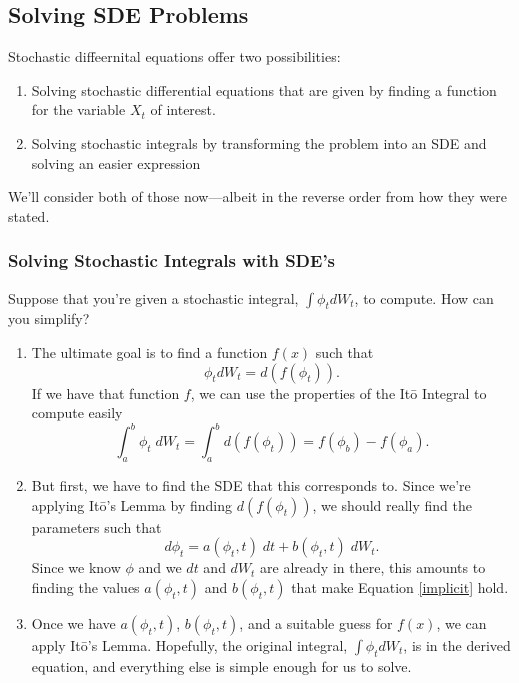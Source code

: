 \documentclass[a4paper,12pt]{scrartcl}
\begin{document}
\subsection{Solving SDE Problems}

Stochastic diffeernital equations offer two possibilities:
   \begin{enumerate}
      \item{Solving stochastic differential equations that are given 
	 by finding a function for the variable $X_t$ of interest.}
      \item{Solving stochastic integrals by transforming the problem
	 into an SDE and solving an easier expression}
   \end{enumerate}
We'll consider both of those now---albeit in the reverse order from
how they were stated.

\subsubsection{Solving Stochastic Integrals with SDE's}

Suppose that you're given a stochastic integral, $\int \phi_t dW_t$,
to compute. How can you simplify?
\begin{enumerate}
   \item{The ultimate goal is to find a function $f(x)$ such that 
      \[\phi_t dW_t = d(f(\phi_t)).\]
      If we have that function $f$, we can use the properties of the
      It\={o} Integral to compute easily
      \[ \int^b_a \phi_t\; dW_t =  \int^b_a d(f(\phi_t)) = 
	 f(\phi_b) - f(\phi_a).\]
	 }
   \item{But first, we have to find the SDE that this corresponds to. 
      Since we're applying It\={o}'s Lemma by finding $d(f(\phi_t))$, we
      should really find the parameters such that
      \begin{equation}
	 \label{implicit}
	 d\phi_t = a(\phi_t, t)\;dt + b(\phi_t, t) \; dW_t.
      \end{equation}
      Since we know $\phi$ and we $dt$ and $dW_t$ are already in there,
      this amounts to finding the values $a(\phi_t, t)$ and $b(\phi_t,t)$
      that make Equation \ref{implicit} hold.
	 } 
   \item{Once we have $a(\phi_t, t)$, $b(\phi_t, t)$, and a suitable 
      guess for $f(x)$, we can apply It\={o}'s Lemma.  Hopefully,
      the original integral, $\int \phi_t dW_t$, is in the derived 
      equation, and everything else is simple enough for us to solve.}
\end{enumerate}
\end{document}
